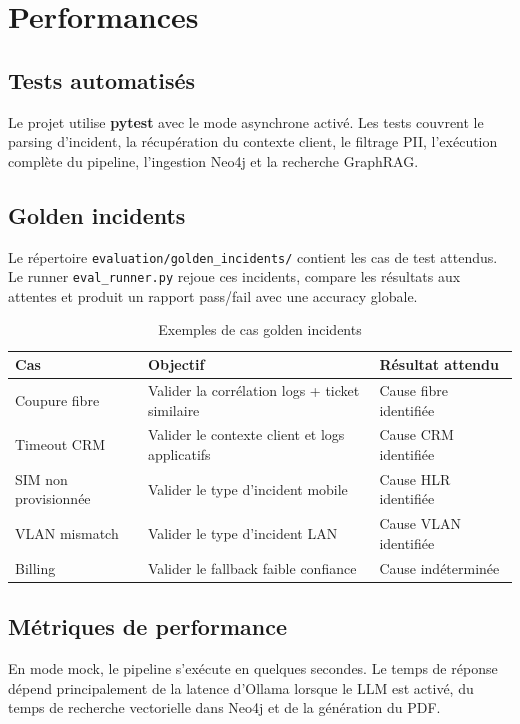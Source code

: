 \section{Performances}

\subsection{Tests automatisés}
Le projet utilise \textbf{pytest} avec le mode asynchrone activé. Les tests couvrent le parsing d'incident, la récupération du contexte client, le filtrage PII, l'exécution complète du pipeline, l'ingestion Neo4j et la recherche GraphRAG.

\subsection{Golden incidents}
Le répertoire \texttt{evaluation/golden\_incidents/} contient les cas de test attendus. Le runner \texttt{eval\_runner.py} rejoue ces incidents, compare les résultats aux attentes et produit un rapport pass/fail avec une accuracy globale.

\begin{table}[H]
    \centering
    \renewcommand{\arraystretch}{1.2}
    \begin{tabular}{|l|p{7cm}|l|}
        \hline
        \rowcolor{iNavy} \textbf{\color{white}Cas} & \textbf{\color{white}Objectif} & \textbf{\color{white}Résultat attendu} \\ \hline
        Coupure fibre & Valider la corrélation logs + ticket similaire & Cause fibre identifiée \\ \hline
        Timeout CRM & Valider le contexte client et logs applicatifs & Cause CRM identifiée \\ \hline
        SIM non provisionnée & Valider le type d'incident mobile & Cause HLR identifiée \\ \hline
        VLAN mismatch & Valider le type d'incident LAN & Cause VLAN identifiée \\ \hline
        Billing & Valider le fallback faible confiance & Cause indéterminée \\ \hline
    \end{tabular}
    \caption{Exemples de cas golden incidents}
    \label{tab:golden}
\end{table}

\subsection{Métriques de performance}
En mode mock, le pipeline s'exécute en quelques secondes. Le temps de réponse dépend principalement de la latence d'Ollama lorsque le LLM est activé, du temps de recherche vectorielle dans Neo4j et de la génération du PDF.

